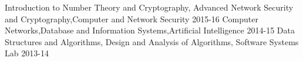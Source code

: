 \begin{cvhonors}
  \cvhonor
    {}
    {\hspace{-1.5mm} Introduction to Number Theory and Cryptography, Advanced Network Security and Cryptography,Computer and Network Security}
    {}
    {2015-16}
  \cvhonor
    {}
    {\hspace{-1.5mm}Computer Networks,Database and Information Systems,Artificial Intelligence}
    {}
    {2014-15}
   \cvhonor
    {}
    {\hspace{-1.5mm}Data Structures and Algorithms, Design and Analysis of Algorithms, Software Systems Lab}
    {}
    {2013-14}
\end{cvhonors}
